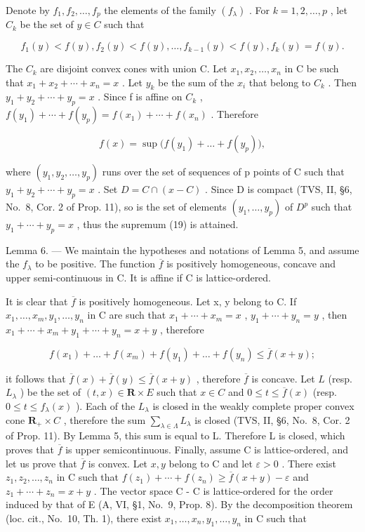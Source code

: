 Denote by \(f_1, f_2, \ldots, f_p\) the elements of the family \((f_\lambda)\) . For \(k = 1, 2, \ldots, p\) , let \(C_k\) be the set of \(y \in C\) such that

\[
f _ {1} (y) <   f (y), f _ {2} (y) <   f (y), \dots , f _ {k - 1} (y) <   f (y), f _ {k} (y) = f (y).
\]

The \(C_{k}\) are disjoint convex cones with union C. Let \(x_{1}, x_{2}, \ldots, x_{n}\) in C be such that \(x_{1} + x_{2} + \cdots + x_{n} = x\) . Let \(y_{k}\) be the sum of the \(x_{i}\) that belong to \(C_{k}\) . Then \(y_{1} + y_{2} + \cdots + y_{p} = x\) . Since f is affine on \(C_{k}\) , \(f(y_{1}) + \cdots + f(y_{p}) = f(x_{1}) + \cdots + f(x_{n})\) . Therefore

\[
f (x) = \sup \bigl (f (y _ {1}) + \dots + f (y _ {p}) \bigr),\tag{19}
\]

where \((y_{1}, y_{2}, \ldots, y_{p})\) runs over the set of sequences of p points of C such that \(y_{1} + y_{2} + \cdots + y_{p} = x\) . Set \(D = C \cap (x - C)\) . Since D is compact (TVS, II, §6, No.~8, Cor. 2 of Prop. 11), so is the set of elements \((y_{1}, \ldots, y_{p})\) of \(D^{p}\) such that \(y_{1} + \cdots + y_{p} = x\) , thus the supremum (19) is attained.

Lemma 6. --- We maintain the hypotheses and notations of Lemma 5, and assume the \(f_{\lambda}\) to be positive. The function \(\overline{f}\) is positively homogeneous, concave and upper semi-continuous in C. It is affine if C is lattice-ordered.

It is clear that \(\overline{f}\) is positively homogeneous. Let x, y belong to C. If \(x_{1}, \ldots, x_{m}, y_{1}, \ldots, y_{n}\) in C are such that \(x_{1} + \cdots + x_{m} = x\) , \(y_{1} + \cdots + y_{n} = y\) , then \(x_{1} + \cdots + x_{m} + y_{1} + \cdots + y_{n} = x + y\) , therefore

\[
f (x _ {1}) + \dots + f (x _ {m}) + f (y _ {1}) + \dots + f (y _ {n}) \leqslant \overline {{f}} (x + y);
\]

it follows that \(\overline{f}(x) + \overline{f}(y) \leqslant \overline{f}(x + y)\) , therefore \(\overline{f}\) is concave. Let \(L\) (resp. \(L_{\lambda}\) ) be the set of \((t, x) \in \mathbf{R} \times E\) such that \(x \in C\) and \(0 \leqslant t \leqslant \overline{f}(x)\) (resp. \(0 \leqslant t \leqslant f_{\lambda}(x)\) ). Each of the \(L_{\lambda}\) is closed in the weakly complete proper convex cone \(\mathbf{R}_{+} \times C\) , therefore the sum \(\sum_{\lambda \in \Lambda} L_{\lambda}\) is closed (TVS, II, §6, No.~8, Cor. 2 of Prop. 11). By Lemma 5, this sum is equal to L. Therefore L is closed, which proves that \(\overline{f}\) is upper semicontinuous. Finally, assume C is lattice-ordered, and let us prove that \(\overline{f}\) is convex. Let \(x, y\) belong to C and let \(\varepsilon > 0\) . There exist \(z_1, z_2, \ldots, z_n\) in C such that \(f(z_1) + \cdots + f(z_n) \geqslant \overline{f}(x + y) - \varepsilon\) and \(z_1 + \cdots + z_n = x + y\) . The vector space C - C is lattice-ordered for the order induced by that of E (A, VI, §1, No.~9, Prop. 8). By the decomposition theorem (loc. cit., No.~10, Th. 1), there exist \(x_1, \ldots, x_n, y_1, \ldots, y_n\) in C such that

